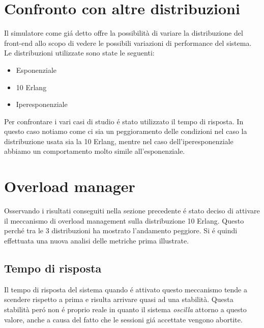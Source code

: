  \section{Confronto con altre distribuzioni}
 Il simulatore come gi\'a detto offre la possibilità di variare la distribuzione del front-end allo scopo di vedere le possibili variazioni di performance del sistema.
 Le distribuzioni utilizzate sono state le seguenti:
 \begin{itemize}
  \item Esponenziale
  \item 10 Erlang
  \item Iperesponenziale
 \end{itemize}
Per confrontare i vari casi di studio \'e stato utilizzato il tempo di risposta. In questo caso notiamo come ci sia un peggioramento delle condizioni nel caso la distribuzione usata sia la 10 Erlang, mentre nel caso dell'iperesponenziale abbiamo un comportamento molto simile all'esponenziale.

\section{Overload manager}
Osservando i risultati conseguiti nella sezione precedente \'e stato deciso di attivare il meccanismo di overload management sulla distribuzione 10 Erlang. Questo perch\'e tra le 3 distribuzioni ha mostrato l'andamento peggiore. Si \'e quindi effettuata una nuova analisi delle metriche prima illustrate.

\subsection{Tempo di risposta}
Il tempo di risposta del sistema quando \'e attivato questo meccanismo tende a scendere rispetto a prima e risulta arrivare quasi ad una stabilità. Questa stabilità per\'o non \'e proprio reale in quanto il sistema \textit{oscilla} attorno a questo valore, anche a causa del fatto che le sessioni gi\'a accettate vengono abortite.

